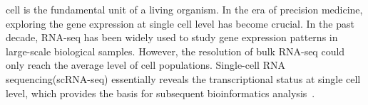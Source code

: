 \documentclass[10pt,journal,compsoc]{IEEEtran}
\begin{document}
\IEEEdisplaynontitleabstractindextext



%
\IEEEpeerreviewmaketitle



% 
% 
% 
% 


 cell is the fundamental unit of a living organism. In the era of precision medicine, exploring the gene expression at single cell level has become crucial. In the past decade, RNA-seq has been widely used to study gene expression patterns in large-scale biological samples. However, the resolution of bulk RNA-seq could only reach the average level of cell populations. Single-cell RNA sequencing(scRNA-seq) essentially reveals the transcriptional status at single cell level, which provides the basis for subsequent bioinformatics analysis~\cite{Papalexi2018SinglecellRS}. 
\end{document}
